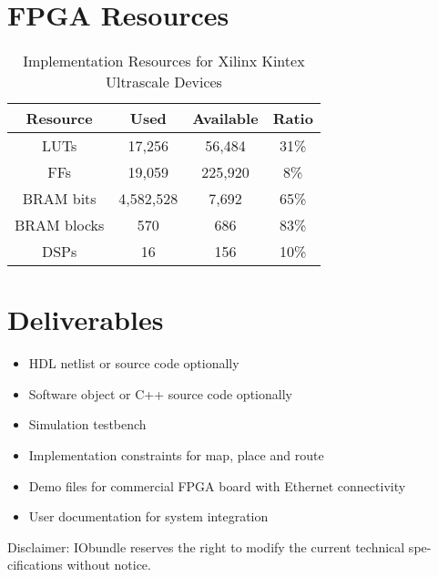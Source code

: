 \documentclass[twocolumn]{iob_pb}
\begin{document}
\section*{FPGA Resources}
\begin{table}[H]
  \begin{center}
    \begin{tabular}{|c|c|c|c|}
      \hline

      \rowcolor{iob-green}
      \textbf{Resource}  & \textbf{Used} & \textbf{Available} & \textbf{Ratio}\\
      \hline
      \hline

      LUTs & 17,256 & 56,484 & 31\%\\
      \hline

      \rowcolor{iob-blue}
      FFs & 19,059  & 225,920 & 8\%\\
      \hline

      BRAM bits & 4,582,528 & 7,692 & 65\%\\
      \hline

      BRAM blocks & 570 & 686 & 83\%\\
      \hline

      \rowcolor{iob-blue}
      DSPs & 16 & 156 & 10\%\\
      \hline
      
    \end{tabular}
    \caption{Implementation Resources for Xilinx Kintex Ultrascale Devices}
    \label{tab:res}
  \end{center}
\end{table}


\section*{\textcolor[rgb]{0,0,0}{Deliverables}}
\begin{itemize}
\item HDL netlist or source code optionally
\item Software object or C++ source code optionally
\item Simulation testbench
\item Implementation constraints for map, place and route
\item Demo files for commercial FPGA board with Ethernet connectivity
\item User documentation for system integration
\end{itemize}

\vspace*{0.5cm}
\noindent
\begin{scriptsize}
Disclaimer: IObundle reserves the right to modify the current
technical spe-cifications without notice.
\end{scriptsize}
\end{document}
